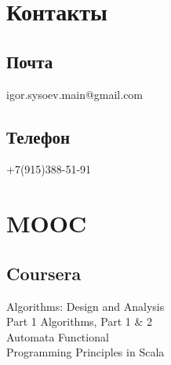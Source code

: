 \documentclass[a4paper]{curricula-vitae}
\begin{document}



\begin{minipage}[t]{0.33\textwidth} %

\section{Контакты} 

\subsection{Почта}
igor.sysoev.main@gmail.com

\insertspace

\subsection{Телефон}
+7(915)388-51-91


\insertspace

\section{MOOC}

\subsection{Coursera}
Algorithms: Design and Analysis \\
Part 1 \textbullet{} Algorithms, Part 1 \& 2 \\ 
Automata \textbullet{} Functional \\
Programming Principles in Scala


\end{minipage}
\end{document}

